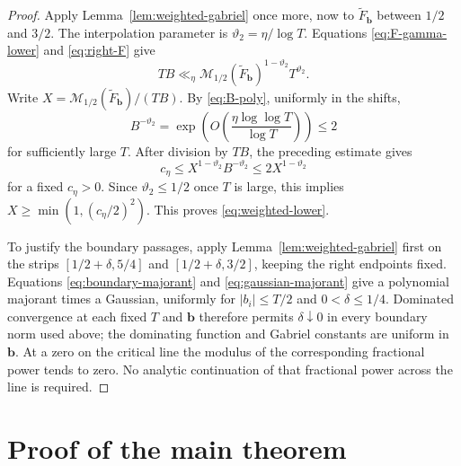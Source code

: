 \documentclass[11pt]{amsart}
\numberwithin{equation}{section}
\theoremstyle{plain}
\renewcommand{\tilde}{\widetilde}
\renewcommand{\le}{\leqslant}
\renewcommand{\ge}{\geqslant}
\begin{document}
\begin{proof}
Apply Lemma~\ref{lem:weighted-gabriel} once more, now to
$\tilde F_{\mathbf b}$ between $1/2$ and $3/2$.  The interpolation
parameter is $\vartheta_2=\eta/\log T$.  Equations
\eqref{eq:F-gamma-lower} and \eqref{eq:right-F} give
\begin{equation*}
TB\ll_\eta
\mathcal M_{1/2}(\tilde F_{\mathbf b})^{1-\vartheta_2}
T^{\vartheta_2}.
\end{equation*}
Write
$X=\mathcal M_{1/2}(\tilde F_{\mathbf b})/(TB)$.  By
\eqref{eq:B-poly}, uniformly in the shifts,
\begin{equation*}
B^{-\vartheta_2}
=\exp\!\left(O\left(\frac{\eta\log\log T}{\log T}\right)\right)
\le2
\end{equation*}
for sufficiently large $T$.  After division by $TB$, the preceding
estimate gives
\begin{equation*}
c_\eta\le X^{1-\vartheta_2}B^{-\vartheta_2}
\le2X^{1-\vartheta_2}
\end{equation*}
for a fixed $c_\eta>0$.  Since $\vartheta_2\le1/2$ once $T$ is large,
this implies $X\ge\min(1,(c_\eta/2)^2)$.  This proves
\eqref{eq:weighted-lower}.

To justify the boundary passages, apply Lemma~\ref{lem:weighted-gabriel}
first on the strips $[1/2+\delta,5/4]$ and
$[1/2+\delta,3/2]$, keeping the right endpoints fixed.  Equations
\eqref{eq:boundary-majorant} and
\eqref{eq:gaussian-majorant} give a polynomial majorant times a Gaussian,
uniformly for $|b_i|\le T/2$ and $0<\delta\le1/4$.  Dominated convergence
at each fixed $T$ and $\mathbf b$ therefore permits $\delta\downarrow0$
in every boundary norm used above; the dominating function and Gabriel
constants are uniform in $\mathbf b$.  At a zero on the critical line the
modulus of the corresponding fractional power tends to zero.  No analytic
continuation of that fractional power across the line is required.
\end{proof}

\section{Proof of the main theorem}\label{sec:main-proof}
\end{document}
